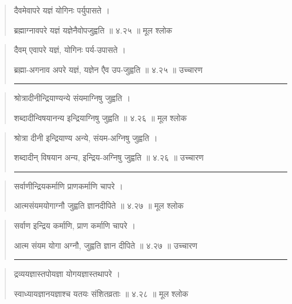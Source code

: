 \begin{quotation}

दैवमेवापरे यज्ञं योगिनः पर्युपासते  ।  

ब्रह्माग्नावपरे यज्ञं यज्ञेनैवोपजुह्वति  ॥ ४.२५ ॥  मूल श्लोक
\end{quotation}

\begin{quotation}

दैवम् एवापरे यज्ञं, योगिनः पर्य-उपासते  ।  
 
ब्रह्मा-अगनाव अपरे यज्ञं, यज्ञेन एैव उप-जुह्वति  ॥ ४.२५ ॥  उच्चारण

\noindent\rule{16cm}{0.4pt} 
\end{quotation}


\begin{quotation}

श्रोत्रादीनीन्द्रियाण्यन्ये संयमाग्निषु जुह्वति ।  

शब्दादीन्विषयानन्य इन्द्रियाग्निषु जुह्वति  ॥ ४.२६ ॥  मूल श्लोक
\end{quotation}

\begin{quotation}

श्रोत्रा दीनी इन्द्रियाण्य अन्ये, संयम-अग्निषु जुह्वति ।  

शब्दादीन् विषयान अन्य, इन्द्रिय-अग्निषु जुह्वति  ॥ ४.२६ ॥  उच्चारण

\noindent\rule{16cm}{0.4pt} 
\end{quotation}


\begin{quotation}

सर्वाणीन्द्रियकर्माणि प्राणकर्माणि चापरे  ।  

आत्मसंयमयोगाग्नौ जुह्वति ज्ञानदीपिते  ॥ ४.२७ ॥  मूल श्लोक
\end{quotation}

\begin{quotation}

सर्वाण इन्द्रिय कर्माणि, प्राण कर्माणि चापरे  ।  

आत्म संयम योगा अग्नौ, जुह्वति ज्ञान दीपिते  ॥ ४.२७ ॥  उच्चारण

\noindent\rule{16cm}{0.4pt} 
\end{quotation}


\begin{quotation}

द्रव्ययज्ञास्तपोयज्ञा योगयज्ञास्तथापरे  ।  

स्वाध्यायज्ञानयज्ञाश्च यतयः संशितव्रताः  ॥ ४.२८ ॥  मूल श्लोक
\end{quotation}

